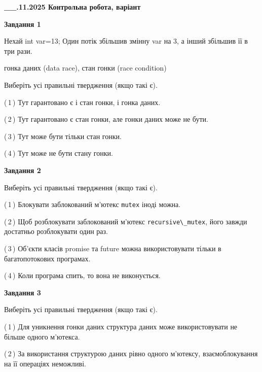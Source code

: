 \documentclass[12pt, ukrainian]{article}
\def\code#1{\Verb!#1!}
\begin{document}
\begin {large}

\textbf{\_\_.11.2025 Контрольна робота, варіант  }\par


{

\begin{center}
\textbf{Завдання 1}
\end{center}
Нехай int var=13; Один потік збільшив змінну var на 3, а інший збільшив її в три рази.

гонка даних (data race), стан гонки (race condition)

Виберіть усі правильні твердження (якщо такі є).\par
\vspace{2mm}
(\,1\,) Тут гарантовано є і стан гонки, і гонка даних.%

(\,2\,) Тут гарантовано є стан гонки, але гонки даних може не бути.%

(\,3\,) Тут може бути тільки стан гонки.%

(\,4\,) Тут може не бути стану гонки.%



\begin{center}
\textbf{Завдання 2}
\end{center}
Виберіть усі правильні твердження (якщо такі є).\par
\vspace{2mm}

(\,1\,) Блокувати заблокований м’ютекс  \code{mutex} іноді можна.%

(\,2\,) Щоб розблокувати заблокований м’ютекс \code{recursive\_mutex}, його завжди достатньо розблокувати один раз.%

(\,3\,) Об’єкти класів promise та future можна використовувати тільки в багатопотокових програмах.%

(\,4\,) Коли програма спить, то вона не виконується.%



\begin{center}
\textbf{Завдання 3}
\end{center}
Виберіть усі правильні твердження (якщо такі є).\par
\vspace{2mm}

(\,1\,) Для уникнення гонки даних структура даних може використовувати не більше одного м’ютекса.%

(\,2\,) За використання структурою даних рівно одного м’ютексу, взаємоблокування на її операціях неможливі.%

}
\end{large}
\end{document}
